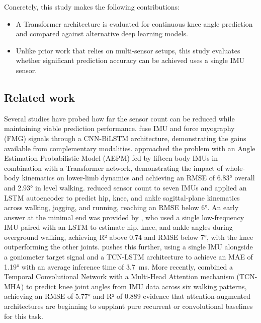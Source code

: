 Concretely, this study makes the following contributions:
\begin{itemize}
\item A Transformer architecture is evaluated for continuous knee angle prediction and compared against alternative deep learning models.
\item Unlike prior work that relies on multi-sensor setups, this study evaluates whether significant prediction accuracy can be achieved uses a single IMU sensor.
\end{itemize}

\subsection{Related work}
Several studies have probed how far the sensor count can be reduced while maintaining viable prediction performance. \citet{wangEnhancingLocomotionModeRecognition2025} fuse IMU and force myography (FMG) signals through a CNN-BiLSTM architecture, demonstrating the gains available from complementary modalities. \citet{wangGaitSeamlessKnee2025} approached the problem with an Angle Estimation Probabilistic Model (AEPM) fed by fifteen body IMUs in combination with a Transformer network, demonstrating the impact of whole-body kinematics on lower-limb dynamics and achieving an RMSE of 6.83° overall and 2.93° in level walking. \citet{shahGaitSpeedTask2025} reduced sensor count to seven IMUs and applied an LSTM autoencoder to predict hip, knee, and ankle sagittal-plane kinematics across walking, jogging, and running, reaching an RMSE below 6°. An early answer at the minimal end was provided by \citet{sung2021prediction}, who used a single low-frequency IMU paired with an LSTM to estimate hip, knee, and ankle angles during overground walking, achieving R² above 0.74 and RMSE below 7°, with the knee outperforming the other joints. \citet{thudor2025knee} pushes this further, using a single IMU alongside a goniometer target signal and a TCN-LSTM architecture to achieve an MAE of 1.19° with an average inference time of 3.7~ms. More recently, \citet{huang2026multi} combined a Temporal Convolutional Network with a Multi-Head Attention mechanism (TCN-MHA) to predict knee joint angles from IMU data across six walking patterns, achieving an RMSE of 5.77° and R² of 0.889 evidence that attention-augmented architectures are beginning to supplant pure recurrent or convolutional baselines for this task.



